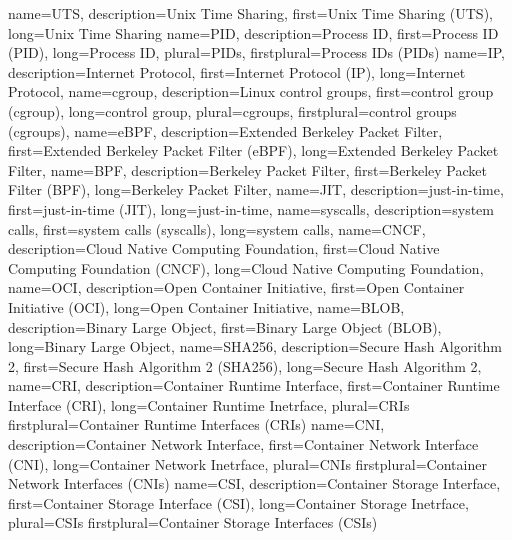 {%
    name={UTS},
    description={Unix Time Sharing},
    first={Unix Time Sharing (UTS)},
    long={Unix Time Sharing}
}
{%
    name={PID},
    description={Process ID},
    first={Process ID (PID)},
    long={Process ID},
    plural={PIDs},
    firstplural={Process IDs (PIDs)}
}
{%
    name={IP},
    description={Internet Protocol},
    first={Internet Protocol (IP)},
    long={Internet Protocol},
}
{%
    name={cgroup},
    description={Linux control groups},
    first={control group (cgroup)},
    long={control group},
    plural={cgroups},
    firstplural={control groups (cgroups)},
}
{%
    name={eBPF},
    description={Extended Berkeley Packet Filter},
    first={Extended Berkeley Packet Filter (eBPF)},
    long={Extended Berkeley Packet Filter},
}
{%
    name={BPF},
    description={Berkeley Packet Filter},
    first={Berkeley Packet Filter (BPF)},
    long={Berkeley Packet Filter},
}
{%
    name={JIT},
    description={just-in-time},
    first={just-in-time (JIT)},
    long={just-in-time},
}
{%
    name={syscalls},
    description={system calls},
    first={system calls (syscalls)},
    long={system calls},
}
{%
    name={CNCF},
    description={Cloud Native Computing Foundation},
    first={Cloud Native Computing Foundation (CNCF)},
    long={Cloud Native Computing Foundation},
}
{%
    name={OCI},
    description={Open Container Initiative},
    first={Open Container Initiative (OCI)},
    long={Open Container Initiative},
}
{%
    name={BLOB},
    description={Binary Large Object},
    first={Binary Large Object (BLOB)},
    long={Binary Large Object},
}
{%
    name={SHA256},
    description={Secure Hash Algorithm 2},
    first={Secure Hash Algorithm 2 (SHA256)},
    long={Secure Hash Algorithm 2},
}
{%
    name={CRI},
    description={Container Runtime Interface},
    first={Container Runtime Interface (CRI)},
    long={Container Runtime Inetrface},
    plural={CRIs}
    firstplural={Container Runtime Interfaces (CRIs)}
}
{%
    name={CNI},
    description={Container Network Interface},
    first={Container Network Interface (CNI)},
    long={Container Network Inetrface},
    plural={CNIs}
    firstplural={Container Network Interfaces (CNIs)}
}
{%
    name={CSI},
    description={Container Storage Interface},
    first={Container Storage Interface (CSI)},
    long={Container Storage Inetrface},
    plural={CSIs}
    firstplural={Container Storage Interfaces (CSIs)}
}
